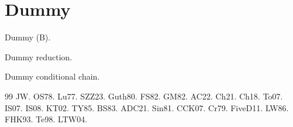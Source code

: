 

\section{Dummy}
\begin{theorem}\label{thm:main}Dummy (B).\end{theorem}
\begin{theorem}\label{thm:reduction}Dummy reduction.\end{theorem}
\begin{theorem}\label{thm:conditional}Dummy conditional chain.\end{theorem}

\begin{thebibliography}{99}
 JW.  OS78.  Lu77.  SZZ23.
 Guth80.  FS82.  GM82.  AC22.
 Ch21.  Ch18.  To07.  IS07.
 IS08.  KT02.  TY85.  BS83.
 ADC21.  Sin81.  CCK07.  Cr79.
 FiveD11.  LW86.  FHK93.  Te98.
 LTW04.
\end{thebibliography}

